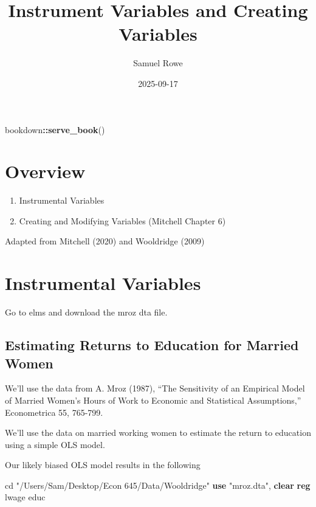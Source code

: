 \documentclass[
]{book}
\title{Instrument Variables and Creating Variables}
\author{Samuel Rowe}
\date{2025-09-17}
\newenvironment{Shaded}{\begin{snugshade}}{\end{snugshade}}
\newcommand{\FunctionTok}[1]{\textcolor[rgb]{0.13,0.29,0.53}{\textbf{#1}}}
\newcommand{\KeywordTok}[1]{\textcolor[rgb]{0.13,0.29,0.53}{\textbf{#1}}}
\newcommand{\NormalTok}[1]{#1}
\newcommand{\SpecialCharTok}[1]{\textcolor[rgb]{0.81,0.36,0.00}{\textbf{#1}}}
\newcommand{\StringTok}[1]{\textcolor[rgb]{0.31,0.60,0.02}{#1}}
\providecommand{\tightlist}{%
  \setlength{\itemsep}{0pt}\setlength{\parskip}{0pt}}
\begin{document}
\maketitle

{
\setcounter{tocdepth}{1}
\tableofcontents
}
\begin{Shaded}
\begin{Highlighting}[]
\NormalTok{bookdown}\SpecialCharTok{::}\FunctionTok{serve\_book}\NormalTok{()}
\end{Highlighting}
\end{Shaded}

\chapter*{Overview}\label{overview}

\begin{enumerate}
\def\labelenumi{\arabic{enumi}.}
\tightlist
\item
  Instrumental Variables
\item
  Creating and Modifying Variables (Mitchell Chapter 6)
\end{enumerate}

Adapted from Mitchell (2020) and Wooldridge (2009)

\chapter{Instrumental Variables}\label{instrumental-variables}

Go to elms and download the mroz dta file.

\section{Estimating Returns to Education for Married Women}\label{estimating-returns-to-education-for-married-women}

We'll use the data from A. Mroz (1987), ``The Sensitivity of an Empirical Model of Married Women's Hours of Work to Economic and Statistical Assumptions,'' Econometrica 55, 765-799.

We'll use the data on married working women to estimate the return to education
using a simple OLS model.

Our likely biased OLS model results in the following

\begin{Shaded}
\begin{Highlighting}[]
\NormalTok{cd }\StringTok{"/Users/Sam/Desktop/Econ 645/Data/Wooldridge"}
\KeywordTok{use} \StringTok{"mroz.dta"}\NormalTok{, }\KeywordTok{clear}
\KeywordTok{reg}\NormalTok{ lwage educ}
\end{Highlighting}
\end{Shaded}
\end{document}
